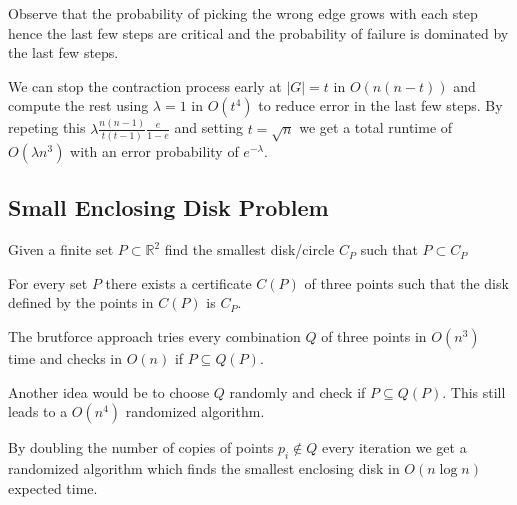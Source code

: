 \begin{remark}
	Observe that the probability of picking the wrong edge grows with each step hence the last few steps are critical and the probability of failure is dominated by the last few steps.
\end{remark}

\begin{theorem}
	We can stop the contraction process early at $|G| = t$ in $O(n(n-t))$ and compute the rest using $\lambda = 1$ in $O(t^4)$ to reduce error in the last few steps. By repeting this $\lambda \frac{n(n-1)}{t(t-1)}\frac{e}{1-e}$ and setting $t=\sqrt{n}$ we get a total runtime of $O(\lambda n^3)$ with an error probability of $e^{-\lambda}$.
\end{theorem}

\subsection{Small Enclosing Disk Problem}

\begin{definition}
	Given a finite set $P \subset \mathbb{R}^2$ find the smallest disk/circle $C_P$ such that $P \subset C_P$
\end{definition}

\begin{lemma}
	For every set $P$ there exists a certificate $C(P)$ of three points such that the disk defined by the points in $C(P)$ is $C_P$.
\end{lemma}

\begin{remark}
	The brutforce approach tries every combination $Q$ of three points in $O(n^3)$ time and checks in $O(n)$ if $P \subseteq Q(P)$.
\end{remark}

\begin{remark}
	Another idea would be to choose $Q$ randomly and check if $P \subseteq Q(P)$. This still leads to a $O(n^4)$ randomized algorithm.
\end{remark}

\begin{theorem}
	By doubling the number of copies of points $p_i \notin Q$ every iteration we get a randomized algorithm which finds the smallest enclosing disk in $O(n \log n)$ expected time.
\end{theorem}

